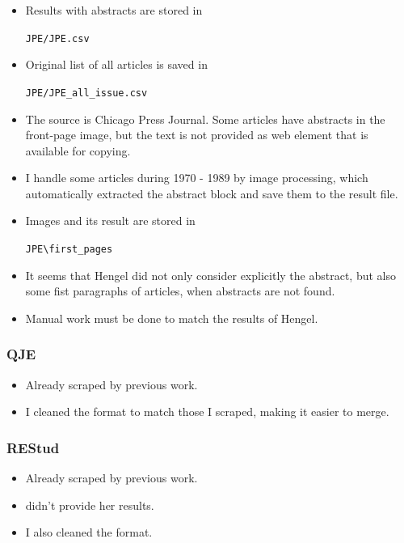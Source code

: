 \begin{itemize}
    \item Results with abstracts are stored in 
    \begin{center}
        \verb|JPE/JPE.csv|
    \end{center}

    \item Original list of all articles is saved in
    \begin{center}
        \verb|JPE/JPE_all_issue.csv|
    \end{center} 

    \item The source is Chicago Press Journal. Some articles have abstracts in the front-page image, but the text is not provided as web element that is available for copying. 
    \item I handle some articles during 1970 - 1989 by image processing, which automatically extracted the abstract block and save them to the result file. 
    \item Images and its result are stored in 
    \begin{center}
        \verb|JPE\first_pages|
    \end{center}

    \item It seems that Hengel did not only consider explicitly the abstract, but also some fist paragraphs of articles, when abstracts are not found. 
    \item Manual work must be done to match the results of Hengel.

\end{itemize}

\subsubsection*{QJE}

\begin{itemize}
    \item Already scraped by previous work.
    \item I cleaned the format to match those I scraped, making it easier to merge.
\end{itemize}

\subsubsection*{REStud}
\begin{itemize}
    \item Already scraped by previous work.
    \item \cite{Hengel17} didn't provide her results.
    \item I also cleaned the format.
\end{itemize}


